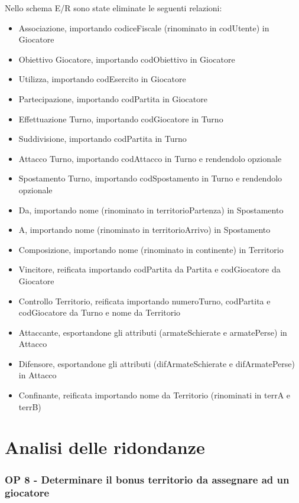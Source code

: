 \documentclass[a4paper,12pt]{report}
\begin{document}
Nello schema E/R sono state eliminate le seguenti relazioni:
\begin{itemize}
    \setlength\itemsep{1pt}
    \item Associazione, importando codiceFiscale (rinominato in codUtente) in Giocatore
    \item Obiettivo Giocatore, importando codObiettivo in Giocatore
    \item Utilizza, importando codEsercito in Giocatore
    \item Partecipazione, importando codPartita in Giocatore
    \item Effettuazione Turno, importando codGiocatore in Turno
    \item Suddivisione, importando codPartita in Turno
    \item Attacco Turno, importando codAttacco in Turno e rendendolo opzionale
    \item Spostamento Turno, importando codSpostamento in Turno e rendendolo opzionale
    \item Da, importando nome (rinominato in territorioPartenza) in Spostamento
    \item A, importando nome (rinominato in territorioArrivo) in Spostamento
    \item Composizione, importando nome (rinominato in continente) in Territorio
    \item Vincitore, reificata importando codPartita da Partita e codGiocatore da Giocatore
    \item Controllo Territorio, reificata importando numeroTurno, codPartita e codGiocatore da Turno e nome da Territorio
    \item Attaccante, esportandone gli attributi (armateSchierate e armatePerse) in Attacco 
    \item Difensore, esportandone gli attributi (difArmateSchierate e difArmatePerse) in Attacco 
    \item Confinante, reificata importando nome da Territorio (rinominati in terrA e terrB)
\end{itemize}

\pagebreak

\section{Analisi delle ridondanze}

\subsubsection{OP 8 - Determinare il bonus territorio da assegnare ad un giocatore}
\end{document}
